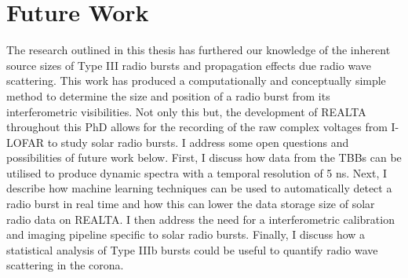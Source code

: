 \section{Future Work}
The research outlined in this thesis has furthered our knowledge of the inherent source sizes of Type III radio bursts and propagation effects due radio wave scattering. This work has produced a computationally and conceptually simple method to determine the size and position of a radio burst from its interferometric visibilities. Not only this but, the development of REALTA throughout this PhD allows for the recording of the raw complex voltages from I-LOFAR to study solar radio bursts. I address some open questions and possibilities of future work below.
First, I discuss how data from the TBBs can be utilised to produce dynamic spectra with a temporal resolution of 5 ns. Next, I describe how machine learning techniques can be used to automatically detect a radio burst in real time and how this can lower the data storage size of solar radio data on REALTA. I then address the need for a interferometric calibration and imaging pipeline specific to solar radio bursts. Finally, I discuss how a statistical analysis of Type IIIb bursts could be useful to quantify radio wave scattering in the corona. 
 
